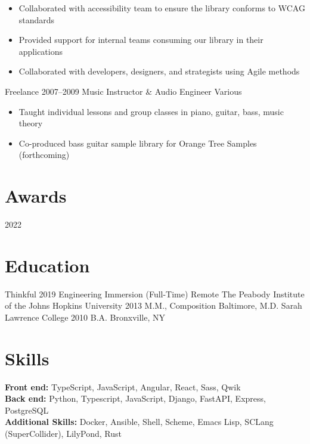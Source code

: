 \documentclass{article}
\begin{document}
\begin{itemize}[leftmargin=0em, label={}]
\begin{itemize}[label=*]
          \item \small Collaborated with accessibility team to ensure the
            library conforms to WCAG standards
          \item \small Provided support for internal teams consuming our library
            in their applications
          \item \small Collaborated with developers, designers, and strategists
            using Agile methods
        \end{itemize}
    \experience
        {Freelance}
        {2007--2009}
        {Music Instructor \& Audio Engineer}
        {Various}
        \begin{itemize}[label=*]
          \item \small Taught individual lessons and group classes in piano,
            guitar, bass, music theory
          \item \small Co-produced bass guitar sample library for Orange Tree
            Samples (forthcoming)
        \end{itemize}
\end{itemize}

\section*{Awards}

\sectionLine

\begin{itemize}[leftmargin=0em, label={}]
        {2022}
\end{itemize}

\section*{Education}

\sectionLine

\begin{itemize}[leftmargin=0em, label={}]
    \experience
        {Thinkful}
        {2019}
        {Engineering Immersion (Full-Time)}
        {Remote}
    \experience
        {The Peabody Institute of the Johns Hopkins University}
        {2013}
        {M.M., Composition}
        {Baltimore, M.D.}
    \experience
        {Sarah Lawrence College}
        {2010}
        {B.A.}
        {Bronxville, NY}
\end{itemize}

\section*{Skills}

\sectionLine

\textbf{Front end:} TypeScript, JavaScript, Angular, React, Sass, Qwik \\
\textbf{Back end:} Python, Typescript, JavaScript, Django, FastAPI, Express,
PostgreSQL \\
\textbf{Additional Skills:} Docker, Ansible, Shell, Scheme, Emacs Lisp, SCLang
(SuperCollider), LilyPond, Rust
\end{document}
